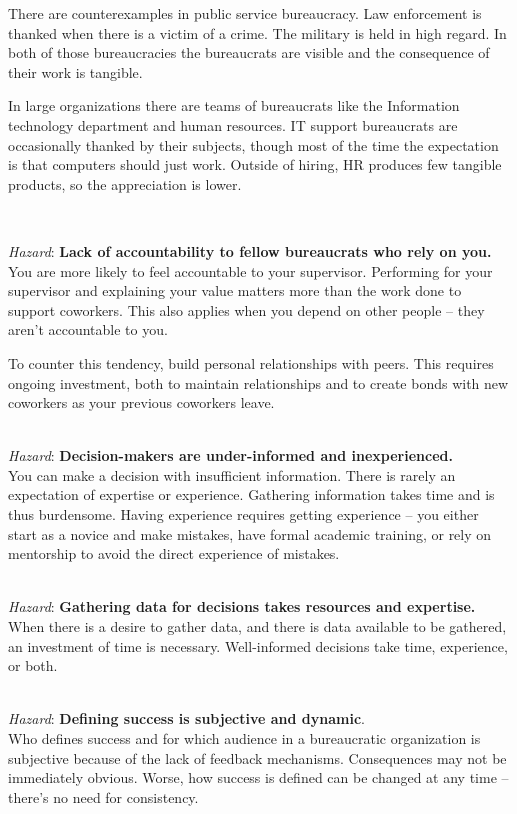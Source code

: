 There are counterexamples in public service bureaucracy. 
Law enforcement is thanked when there is a victim of a crime. 
The military is held in high regard. 
In both of those bureaucracies the bureaucrats are visible and the consequence of their work is tangible. 

In large organizations there are teams of bureaucrats like the Information technology department and human resources. IT support bureaucrats are occasionally thanked by their subjects, though most of the time the expectation is that computers should just work. Outside of hiring, HR produces few tangible products, so the appreciation is lower.


\ \\
\begin{samepage}
\textit{Hazard}: \textbf{Lack of accountability to fellow bureaucrats who rely on you.}\\
You are more likely to feel accountable to your supervisor. Performing for your supervisor and explaining your value matters more than the work done to support coworkers.  This also applies when you depend on other people -- they aren't accountable to you.

To counter this tendency, build personal relationships with peers. This requires ongoing investment, both to maintain relationships and to create bonds with new coworkers as your previous coworkers leave.
\end{samepage}

\ \\
\textit{Hazard}: \textbf{Decision-makers are under-informed and inexperienced.}\\
You can make a decision with insufficient information. There is rarely an expectation of expertise or experience. 
Gathering information takes time and is thus burdensome.
Having experience requires getting experience -- you either start as a novice and make mistakes, have formal academic training, or rely on mentorship to avoid the direct experience of mistakes.

\ \\
\textit{Hazard}: \textbf{Gathering data for decisions takes resources and expertise.}\\
When there is a desire to gather data, and there is data available to be gathered, an investment of time is necessary. Well-informed decisions take time, experience, or both.

\ \\
\textit{Hazard}: \textbf{Defining success is subjective and dynamic}. \\
Who defines success and for which audience in a bureaucratic organization is subjective because of the lack of feedback mechanisms. Consequences may not be immediately obvious. Worse, how success is defined can be changed at any time -- there's no need for consistency. 

